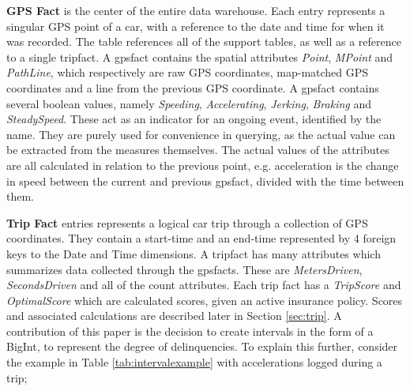 \textbf{GPS Fact} is the center of the entire data warehouse. Each entry represents a singular GPS point of a car, with a reference to the date and time for when it was recorded. The table references all of the support tables, as well as a reference to a single tripfact. A gpsfact contains the spatial attributes \textit{Point}, \textit{MPoint} and \textit{PathLine}, which respectively are raw GPS coordinates, map-matched GPS coordinates and a line from the previous GPS coordinate. A gpsfact contains several boolean values, namely \textit{Speeding}, \textit{Accelerating}, \textit{Jerking}, \textit{Braking} and \textit{SteadySpeed}. These act as an indicator for an ongoing event, identified by the name. They are purely used for convenience in querying, as the actual value can be extracted from the measures themselves. The actual values of the attributes are all calculated in relation to the previous point, e.g. acceleration is the change in speed between the current and previous gpsfact, divided with the time between them.

\textbf{Trip Fact} entries represents a logical car trip through a collection of GPS coordinates. They contain a start-time and an end-time represented by 4 foreign keys to the Date and Time dimensions. A tripfact has many attributes which summarizes data collected through the gpsfacts. These are \textit{MetersDriven}, \textit{SecondsDriven} and all of the count attributes. Each trip fact has a \textit{TripScore} and \textit{OptimalScore} which are calculated scores, given an active insurance policy. Scores and associated calculations are described later in Section \ref{sec:trip}. A contribution of this paper is the decision to create intervals in the form of a BigInt, to represent the degree of delinquencies. To explain this further, consider the example in Table \ref{tab:intervalexample} with accelerations logged during a trip; 

